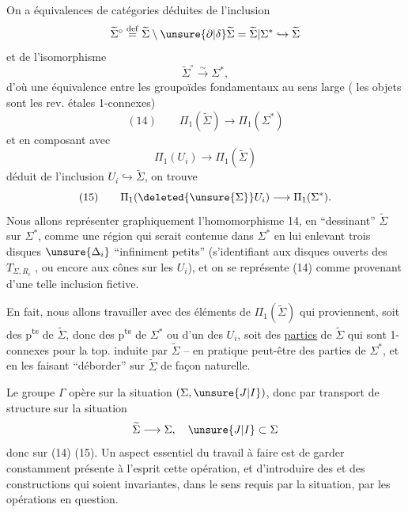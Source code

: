 On a  équivalences de catégories
déduites de l'inclusion
\[
\widetilde\Sigma^\circ \overset{\mathrm{def}}= \widetilde\Sigma\setminus\unsure{\partial|\delta}\widetilde\Sigma = \widetilde\Sigma|\Sigma^* \hookrightarrow \widetilde\Sigma
\]
et de l'isomorphisme
\[
\widetilde\Sigma^\circ \xrightarrow{\sim} \Sigma^*,
\]
d'où une équivalence entre les groupoïdes fondamentaux au sens large ( les objets sont les rev. étales 1-connexes)
\[
(14)\qquad \Pi_1(\widetilde\Sigma) \longrightarrow \Pi_1(\Sigma^*)
\]
et en composant avec
\[
\Pi_1(U_i)\longrightarrow \Pi_1(\widetilde\Sigma)
\]
déduit de l'inclusion $U_i\hookrightarrow\widetilde\Sigma$, on trouve
\[
(15)\qquad \Pi_1(\deleted{\unsure{\Sigma}}U_i)\longrightarrow\Pi_1(\Sigma^*).
\]
Nous allons représenter graphiquement l'homomorphisme 14, en ``dessinant'' $\widetilde\Sigma$ sur $\Sigma^*$, comme une région qui serait contenue dans $\Sigma^*$ en lui enlevant  trois disques  $\unsure{\Delta_i}$ ``infiniment petits''  (s'identifiant aux disques ouverts des $T_{\Sigma,R_i}$ , ou encore aux cônes sur les $U_i$), et on se représente (14) comme provenant d'une telle inclusion fictive.

En fait, nous allons travailler avec des éléments de $\Pi_1(\widetilde\Sigma)$ qui proviennent, soit des p\textsuperscript{ts} de $\widetilde\Sigma$, donc des p\textsuperscript{ts} de $\Sigma^*$ ou d'un des $U_i$, soit des \uline{parties} de $\widetilde\Sigma$ qui sont 1-connexes pour la top. induite par $\widetilde\Sigma$ -- en pratique peut-être des parties  de $\Sigma^*$, et en les faisant ``déborder'' sur $\widetilde\Sigma$ de façon naturelle.

Le groupe $\Gamma$ opère sur la situation  $(\Sigma,\unsure{J|I})$, donc par transport de structure sur la situation
\[
\widetilde\Sigma\longrightarrow\Sigma,\quad \unsure{J|I}\subset\Sigma
\]
donc sur  (14) (15). Un aspect essentiel du travail à faire est de garder  constamment présente à l'esprit cette opération, et d'introduire des  et des constructions qui soient invariantes, dans le sens requis par la situation, par les opérations en question.

